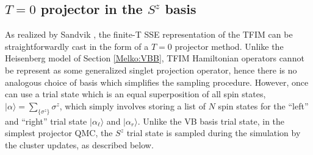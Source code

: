\documentclass[vecphys]{svmult}
\begin{document}
\subsection{$T=0$ projector in the $S^z$ basis} \label{Melko:zeroTFIMsec}

As realized by Sandvik \cite{Melko:unpub}, the finite-T SSE representation of the TFIM can be straightforwardly cast in the form of a $T=0$ projector method.  Unlike the Heisenberg model of Section \ref{Melko:VBB}, TFIM Hamiltonian operators cannot be represent as some generalized singlet projection operator, hence there is no analogous choice of basis which simplifies the sampling procedure.  However, once can use a trial state which is an equal superposition of all spin states, $| \alpha \rangle = \sum_{\{ \sigma^z \}} \sigma^z$, which simply involves storing a list of $N$ spin states for the ``left'' and ``right'' trial state $| \alpha_{\ell}\rangle$ and $| \alpha_r \rangle$.  Unlike the VB basis trial state, in the simplest projector QMC, the $S^z$ trial state is sampled during the simulation by the cluster updates, as described below.
\end{document}
